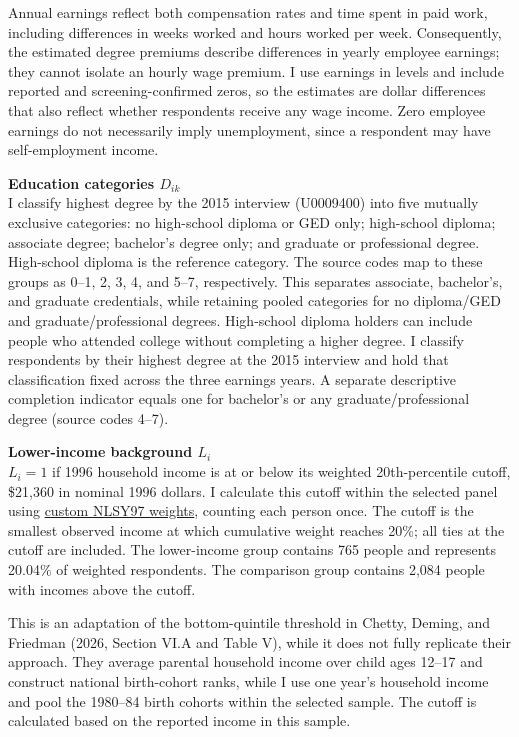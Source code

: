 \documentclass[12pt,letterpaper]{article}
\begin{document}
Annual earnings reflect both compensation rates and time spent in paid work,
including differences in weeks worked and hours worked per week. Consequently,
the estimated degree premiums describe differences in yearly employee earnings;
they cannot isolate an hourly wage premium. I use earnings in levels and include
reported and screening-confirmed zeros, so the estimates are dollar differences
that also reflect whether respondents receive any wage income. Zero employee earnings
do not necessarily imply unemployment, since a respondent may have self-employment
income.\newline

\textbf{Education categories $D_{ik}$}\\
I classify highest degree by the 2015 interview (U0009400) into five mutually exclusive
categories: no high-school diploma or GED only; high-school diploma; associate
degree; bachelor's degree only; and graduate or professional degree. High-school
diploma is the reference category. The source codes map to these groups as
0--1, 2, 3, 4, and 5--7, respectively. This separates associate, bachelor's, and
graduate credentials, while retaining pooled categories for no diploma/GED and
graduate/professional degrees. High-school diploma holders can include people who
attended college without completing a higher degree. I classify respondents by their
highest degree at the 2015 interview and hold that classification fixed across the
three earnings years. A separate descriptive completion indicator
equals one for bachelor's or any graduate/professional degree (source codes 4--7).\newline

\textbf{Lower-income background $L_i$}\\
$L_i=1$ if 1996 household income is at or below its weighted 20th-percentile cutoff,
\$21,360 in nominal 1996 dollars. I calculate this cutoff within the selected panel using
\href{https://www.nlsinfo.org/content/weights/nlsy97}{custom NLSY97 weights}, counting
each person once. The cutoff is the smallest observed income at which cumulative
weight reaches 20\%; all ties at the cutoff are included. The lower-income group
contains 765 people and represents 20.04\% of weighted respondents. The comparison
group contains 2,084 people with incomes above the cutoff.\newline

This is an adaptation of the bottom-quintile threshold in Chetty, Deming, and
Friedman (2026, Section VI.A and Table V), while it does not fully replicate 
their approach. They average parental household income over child ages 12--17 
and construct national birth-cohort ranks, while I use one year's household 
income and pool the 1980--84 birth cohorts within the selected sample. The cutoff 
is calculated based on the reported income in this sample.\newline
\end{document}
